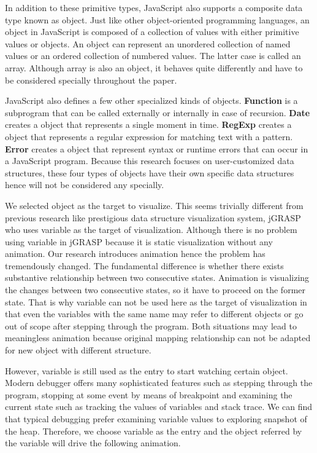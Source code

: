 In addition to these primitive types, JavaScript also supports a composite data type known as object. Just like other object-oriented programming languages, an object in JavaScript is composed of a collection of values with either primitive values or objects. An object can represent an unordered collection of named values or an ordered collection of numbered values. The latter case is called an array. Although array is also an object, it behaves quite differently and have to be considered specially throughout the paper.

JavaScript also defines a few other specialized kinds of objects. \textbf{Function} is a subprogram that can be called externally or internally in case of recursion. \textbf{Date} creates a object that represents a single moment in time. \textbf{RegExp} creates a object that represents a regular expression for matching text with a pattern. \textbf{Error} creates a object that represent syntax or runtime errors that can occur in a JavaScript program. Because this research focuses on user-customized data structures, these four types of objects have their own specific data structures hence will not be considered any specially.

We selected object as the target to visualize. This seems trivially different from previous research like prestigious data structure visualization system, jGRASP \cite{Cross:2007:DOV:1227310.1227316} who uses variable as the target of visualization. Although there is no problem using variable in jGRASP because it is static visualization without any animation. Our research introduces animation hence the problem has tremendously changed. The fundamental difference is whether there exists substantive relationship between two consecutive states. Animation is visualizing the changes between two consecutive states, so it have to proceed on the former state. That is why variable can not be used here as the target of visualization in that even the variables with the same name may refer to different objects or go out of scope after stepping through the program. Both situations may lead to meaningless animation because original mapping relationship can not be adapted for new object with different structure.

However, variable is still used as the entry to start watching certain object. Modern debugger offers many sophisticated features such as stepping through the program, stopping at some event by means of breakpoint and examining the current state such as tracking the values of variables and stack trace. We can find that typical debugging prefer examining variable values to exploring snapshot of the heap. Therefore, we choose variable as the entry and the object referred by the variable will drive the following animation.

